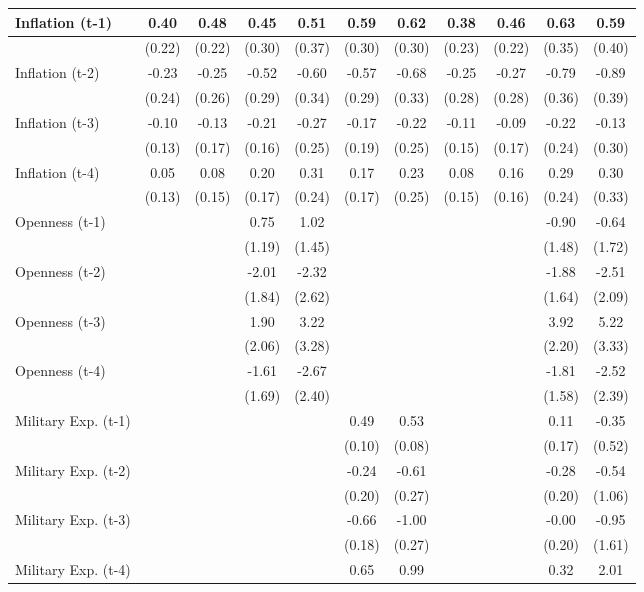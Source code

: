 \begin{tabular}{lcccccccccc}
\toprule
Inflation (t-1) & 0.40 & 0.48 & 0.45 & 0.51 & 0.59 & 0.62 & 0.38 & 0.46 & 0.63 & 0.59 \\
\midrule
& (0.22) & (0.22) & (0.30) & (0.37) & (0.30) & (0.30) & (0.23) & (0.22) & (0.35) & (0.40) \\
Inflation (t-2) & -0.23 & -0.25 & -0.52 & -0.60 & -0.57 & -0.68 & -0.25 & -0.27 & -0.79 & -0.89 \\
& (0.24) & (0.26) & (0.29) & (0.34) & (0.29) & (0.33) & (0.28) & (0.28) & (0.36) & (0.39) \\
Inflation (t-3) & -0.10 & -0.13 & -0.21 & -0.27 & -0.17 & -0.22 & -0.11 & -0.09 & -0.22 & -0.13 \\
& (0.13) & (0.17) & (0.16) & (0.25) & (0.19) & (0.25) & (0.15) & (0.17) & (0.24) & (0.30) \\
Inflation (t-4) & 0.05 & 0.08 & 0.20 & 0.31 & 0.17 & 0.23 & 0.08 & 0.16 & 0.29 & 0.30 \\
& (0.13) & (0.15) & (0.17) & (0.24) & (0.17) & (0.25) & (0.15) & (0.16) & (0.24) & (0.33) \\
Openness (t-1) &  &  & 0.75 & 1.02 &  &  &  &  & -0.90 & -0.64 \\
&  &  & (1.19) & (1.45) &  &  &  &  & (1.48) & (1.72) \\
Openness (t-2) &  &  & -2.01 & -2.32 &  &  &  &  & -1.88 & -2.51 \\
&  &  & (1.84) & (2.62) &  &  &  &  & (1.64) & (2.09) \\
Openness (t-3) &  &  & 1.90 & 3.22 &  &  &  &  & 3.92 & 5.22 \\
&  &  & (2.06) & (3.28) &  &  &  &  & (2.20) & (3.33) \\
Openness (t-4) &  &  & -1.61 & -2.67 &  &  &  &  & -1.81 & -2.52 \\
&  &  & (1.69) & (2.40) &  &  &  &  & (1.58) & (2.39) \\
Military Exp. (t-1) &  &  &  &  & 0.49 & 0.53 &  &  & 0.11 & -0.35 \\
&  &  &  &  & (0.10) & (0.08) &  &  & (0.17) & (0.52) \\
Military Exp. (t-2) &  &  &  &  & -0.24 & -0.61 &  &  & -0.28 & -0.54 \\
&  &  &  &  & (0.20) & (0.27) &  &  & (0.20) & (1.06) \\
Military Exp. (t-3) &  &  &  &  & -0.66 & -1.00 &  &  & -0.00 & -0.95 \\
&  &  &  &  & (0.18) & (0.27) &  &  & (0.20) & (1.61) \\
Military Exp. (t-4) &  &  &  &  & 0.65 & 0.99 &  &  & 0.32 & 2.01 \\

\end{tabular}

